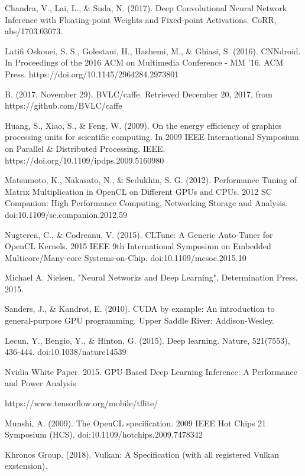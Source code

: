 \begin{thebibliography}{4}
{Chandra, V., Lai, L., \& Suda, N. (2017). Deep Convolutional Neural Network Inference with Floating-point Weights and Fixed-point Activations. CoRR, abs/1703.03073.}

{Latifi Oskouei, S. S., Golestani, H., Hashemi, M., \& Ghiasi, S. (2016). CNNdroid. In Proceedings of the 2016 ACM on Multimedia Conference - MM ’16. ACM Press. https://doi.org/10.1145/2964284.2973801}

{B. (2017, November 29). BVLC/caffe. Retrieved December 20, 2017, from https://github.com/BVLC/caffe}

{Huang, S., Xiao, S., \& Feng, W. (2009). On the energy efficiency of graphics processing units for scientific computing. In 2009 IEEE International Symposium on Parallel \& Distributed Processing. IEEE. https://doi.org/10.1109/ipdps.2009.5160980}

{Matsumoto, K., Nakasato, N., \& Sedukhin, S. G. (2012). Performance Tuning of Matrix Multiplication in OpenCL on Different GPUs and CPUs. 2012 SC Companion: High Performance Computing, Networking Storage and Analysis. doi:10.1109/sc.companion.2012.59}

{Nugteren, C., \& Codreanu, V. (2015). CLTune: A Generic Auto-Tuner for OpenCL Kernels. 2015 IEEE 9th International Symposium on Embedded Multicore/Many-core Systems-on-Chip. doi:10.1109/mcsoc.2015.10}

{Michael A. Nielsen, "Neural Networks and Deep Learning", Determination Press, 2015.}

{Sanders, J., \& Kandrot, E. (2010). CUDA by example: An introduction to general-purpose GPU programming. Upper Saddle River: Addison-Wesley.}

{Lecun, Y., Bengio, Y., \& Hinton, G. (2015). Deep learning. Nature, 521(7553), 436-444. doi:10.1038/nature14539}

{Nvidia White Paper. 2015. GPU-Based Deep Learning Inference: A Performance and Power Analysis}

{https://www.tensorflow.org/mobile/tflite/}

{Munshi, A. (2009). The OpenCL specification. 2009 IEEE Hot Chips 21 Symposium (HCS). doi:10.1109/hotchips.2009.7478342}

{Khronos Group. (2018). Vulkan: A Specification (with all registered Vulkan exstension).}

\end{thebibliography}

